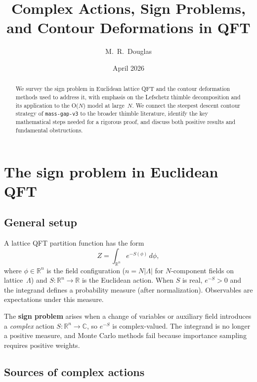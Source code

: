 \documentclass[12pt]{article}
\title{Complex Actions, Sign Problems, and Contour Deformations in QFT}
\author{M.~R.~Douglas}
\date{April 2026}
\theoremstyle{definition}
\theoremstyle{remark}
\newcommand{\R}{\mathbb{R}}
\newcommand{\C}{\mathbb{C}}
\newcommand{\La}{\Lambda}
\begin{document}
\maketitle

\begin{abstract}
We survey the sign problem in Euclidean lattice QFT and the
contour deformation methods used to address it, with emphasis on
the Lefschetz thimble decomposition and its application to the
O($N$) model at large~$N$. We connect the steepest descent contour
strategy of \texttt{mass-gap-v3} to the broader thimble literature,
identify the key mathematical steps needed for a rigorous proof,
and discuss both positive results and fundamental obstructions.
\end{abstract}

\tableofcontents

\section{The sign problem in Euclidean QFT}

\subsection{General setup}

A lattice QFT partition function has the form
\begin{equation}\label{eq:Z}
  Z = \int_{\R^n} e^{-S(\phi)}\,d\phi,
\end{equation}
where $\phi \in \R^n$ is the field configuration ($n = N|\La|$ for
$N$-component fields on lattice~$\La$) and $S : \R^n \to \R$ is the
Euclidean action. When $S$ is real, $e^{-S} > 0$ and the integrand
defines a probability measure (after normalization). Observables are
expectations under this measure.

The \textbf{sign problem} arises when a change of variables or
auxiliary field introduces a \emph{complex} action $S : \R^n \to \C$,
so $e^{-S}$ is complex-valued. The integrand is no longer a positive
measure, and Monte Carlo methods fail because importance sampling
requires positive weights.

\subsection{Sources of complex actions}
\end{document}
